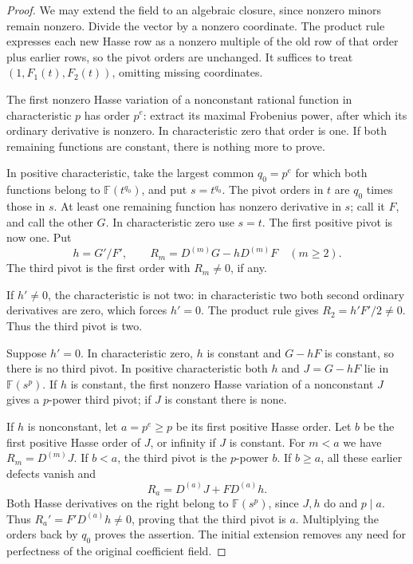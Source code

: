 \documentclass[11pt]{article}
\newcommand{\F}{\mathbb F}
\begin{document}
\begin{proof}
We may extend the field to an algebraic closure, since nonzero minors
remain nonzero. Divide the vector by a nonzero coordinate. The product
rule expresses each new Hasse row as a nonzero multiple of the old row
of that order plus earlier rows, so the pivot orders are unchanged.
It suffices to treat \((1,F_1(t),F_2(t))\), omitting missing coordinates.

The first nonzero Hasse variation of a nonconstant rational function in
characteristic \(p\) has order \(p^e\): extract its maximal Frobenius
power, after which its ordinary derivative is nonzero. In characteristic
zero that order is one. If both remaining functions are constant, there
is nothing more to prove.

In positive characteristic, take the largest common \(q_0=p^e\) for
which both functions belong to \(\F(t^{q_0})\), and put \(s=t^{q_0}\).
The pivot orders in \(t\) are \(q_0\) times those in \(s\). At least
one remaining function has nonzero derivative in \(s\); call it \(F\),
and call the other \(G\). In characteristic zero use \(s=t\).
The first positive pivot is now one. Put
\[
 h=G'/F',\qquad R_m=D^{(m)}G-hD^{(m)}F\quad(m\ge2).
\]
The third pivot is the first order with \(R_m\ne0\), if any.

If \(h'\ne0\), the characteristic is not two: in characteristic two
both second ordinary derivatives are zero, which forces \(h'=0\).
The product rule gives \(R_2=h'F'/2\ne0\). Thus the third pivot is two.

Suppose \(h'=0\). In characteristic zero, \(h\) is constant and
\(G-hF\) is constant, so there is no third pivot. In positive
characteristic both \(h\) and \(J=G-hF\) lie in \(\F(s^p)\).
If \(h\) is constant, the first nonzero Hasse variation of a nonconstant
\(J\) gives a \(p\)-power third pivot; if \(J\) is constant there is
none.

If \(h\) is nonconstant, let \(a=p^e\ge p\) be its first positive
Hasse order. Let \(b\) be the first positive Hasse order of \(J\), or
infinity if \(J\) is constant. For \(m<a\) we have \(R_m=D^{(m)}J\).
If \(b<a\), the third pivot is the \(p\)-power \(b\). If \(b\ge a\),
all these earlier defects vanish and
\[
 R_a=D^{(a)}J+F D^{(a)}h.
\]
Both Hasse derivatives on the right belong to \(\F(s^p)\), since
\(J,h\) do and \(p\mid a\). Thus
\(R_a'=F'D^{(a)}h\ne0\), proving that the third pivot is \(a\).
Multiplying the orders back by \(q_0\) proves the assertion. The
initial extension removes any need for perfectness of the original
coefficient field.
\end{proof}
\end{document}
